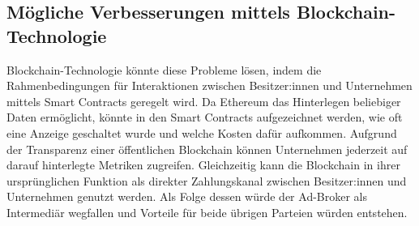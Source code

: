 \subsection{Mögliche Verbesserungen mittels Blockchain-Technologie}
Blockchain-Technologie könnte diese Probleme lösen, indem die Rahmenbedingungen für Interaktionen zwischen Besitzer:innen und Unternehmen mittels Smart Contracts geregelt wird. 
Da Ethereum das Hinterlegen beliebiger Daten ermöglicht, könnte in den Smart Contracts aufgezeichnet werden, wie oft eine Anzeige geschaltet wurde und welche Kosten dafür aufkommen. 
Aufgrund der Transparenz einer öffentlichen Blockchain können Unternehmen jederzeit auf darauf hinterlegte Metriken zugreifen. Gleichzeitig kann die Blockchain in ihrer ursprünglichen Funktion als direkter Zahlungskanal zwischen Besitzer:innen und Unternehmen genutzt werden. Als Folge dessen würde der Ad-Broker als Intermediär wegfallen und Vorteile für beide übrigen Parteien würden entstehen.
